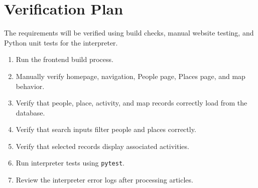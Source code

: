 \section{Verification Plan}

The requirements will be verified using build checks, manual website testing, and Python unit tests for the interpreter.

\begin{enumerate}
	\item Run the frontend build process.
	\item Manually verify homepage, navigation, People page, Places page, and map behavior.
	\item Verify that people, place, activity, and map records correctly load from the database.
	\item Verify that search inputs filter people and places correctly.
	\item Verify that selected records display associated activities.
	\item Run interpreter tests using \texttt{pytest}.
	\item Review the interpreter error logs after processing articles.
\end{enumerate}
